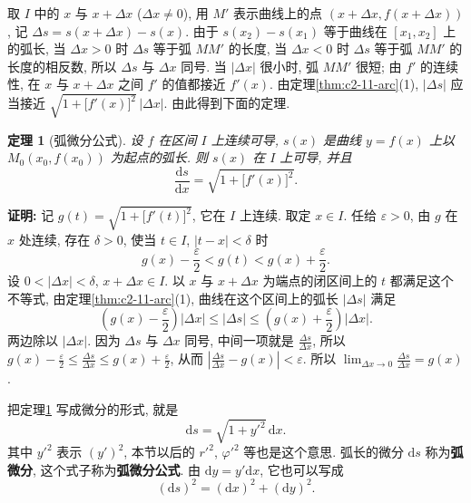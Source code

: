 \documentclass[UTF8,openany]{ctexbook}
\theoremstyle{chinesetextbook}
\newtheorem{theorem}{定理}[section]
\newenvironment{cnproof}{\par\indent\textbf{证明:} \ignorespaces}{\par}
\newcommand{\dd}{\mathrm d}
\begin{document}
取 $I$ 中的 $x$ 与 $x+\Delta x$ ($\Delta x\ne0$), 用 $M'$ 表示曲线上的点 $(x+\Delta x,f(x+\Delta x))$, 记 $\Delta s=s(x+\Delta x)-s(x)$. 由于 $s(x_2)-s(x_1)$ 等于曲线在 $[x_1,x_2]$ 上的弧长, 当 $\Delta x>0$ 时 $\Delta s$ 等于弧 $MM'$ 的长度, 当 $\Delta x<0$ 时 $\Delta s$ 等于弧 $MM'$ 的长度的相反数, 所以 $\Delta s$ 与 $\Delta x$ 同号. 当 $|\Delta x|$ 很小时, 弧 $MM'$ 很短; 由 $f'$ 的连续性, 在 $x$ 与 $x+\Delta x$ 之间 $f'$ 的值都接近 $f'(x)$. 由定理\ref{thm:c2-11-arc}(1), $|\Delta s|$ 应当接近 $\sqrt{1+\bigl[f'(x)\bigr]^2}\,|\Delta x|$. 由此得到下面的定理.
\begin{theorem}[弧微分公式]\label{thm:c2-11-ds}
设 $f$ 在区间 $I$ 上连续可导, $s(x)$ 是曲线 $y=f(x)$ 上以 $M_0(x_0,f(x_0))$ 为起点的弧长. 则 $s(x)$ 在 $I$ 上可导, 并且
\[
\frac{\dd s}{\dd x}=\sqrt{1+\bigl[f'(x)\bigr]^2}.
\]
\end{theorem}
\begin{cnproof}
记 $g(t)=\sqrt{1+\bigl[f'(t)\bigr]^2}$, 它在 $I$ 上连续. 取定 $x\in I$. 任给 $\varepsilon>0$, 由 $g$ 在 $x$ 处连续, 存在 $\delta>0$, 使当 $t\in I$, $|t-x|<\delta$ 时
\[
g(x)-\frac\varepsilon2<g(t)<g(x)+\frac\varepsilon2.
\]
设 $0<|\Delta x|<\delta$, $x+\Delta x\in I$. 以 $x$ 与 $x+\Delta x$ 为端点的闭区间上的 $t$ 都满足这个不等式, 由定理\ref{thm:c2-11-arc}(1), 曲线在这个区间上的弧长 $|\Delta s|$ 满足
\[
\left(g(x)-\frac\varepsilon2\right)|\Delta x|\le|\Delta s|\le\left(g(x)+\frac\varepsilon2\right)|\Delta x|.
\]
两边除以 $|\Delta x|$. 因为 $\Delta s$ 与 $\Delta x$ 同号, 中间一项就是 $\displaystyle\frac{\Delta s}{\Delta x}$, 所以 $\displaystyle g(x)-\frac\varepsilon2\le\frac{\Delta s}{\Delta x}\le g(x)+\frac\varepsilon2$, 从而 $\displaystyle\left|\frac{\Delta s}{\Delta x}-g(x)\right|<\varepsilon$. 所以 $\displaystyle\lim_{\Delta x\to0}\frac{\Delta s}{\Delta x}=g(x)$.
\end{cnproof}
把定理\ref{thm:c2-11-ds} 写成微分的形式, 就是
\[
\dd s=\sqrt{1+y'^2}\,\dd x.
\]
其中 $y'^2$ 表示 $(y')^2$, 本节以后的 $r'^2$, $\varphi'^2$ 等也是这个意思. 弧长的微分 $\dd s$ 称为\textbf{弧微分}, 这个式子称为\textbf{弧微分公式}. 由 $\dd y=y'\dd x$, 它也可以写成
\[
(\dd s)^2=(\dd x)^2+(\dd y)^2.
\]
\end{document}
